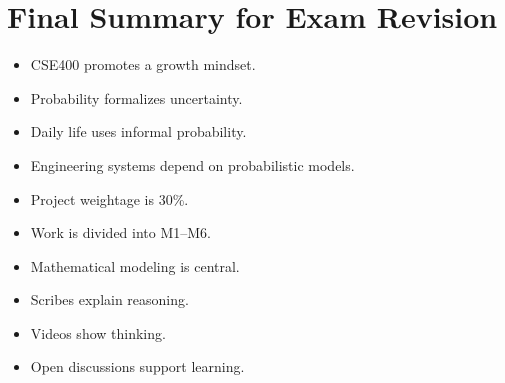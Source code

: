 \documentclass[12pt]{article}
\begin{document}
\section*{Final Summary for Exam Revision}

\begin{itemize}
\item CSE400 promotes a growth mindset.
\item Probability formalizes uncertainty.
\item Daily life uses informal probability.
\item Engineering systems depend on probabilistic models.
\item Project weightage is 30\%.
\item Work is divided into M1--M6.
\item Mathematical modeling is central.
\item Scribes explain reasoning.
\item Videos show thinking.
\item Open discussions support learning.
\end{itemize}
\end{document}
